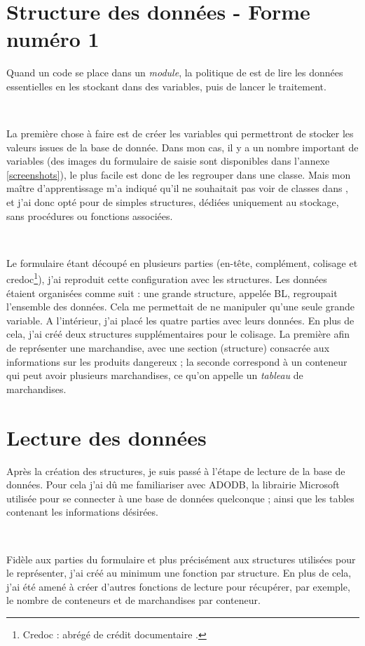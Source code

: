 \section{Structure des données - Forme numéro 1}
Quand un code se place dans un \emph{module}, la politique de \solulog{} est de lire les données essentielles en les stockant dans des variables, puis de lancer le traitement.

~

La première chose à faire est de créer les variables qui permettront de stocker les valeurs issues de la base de donnée. Dans mon cas, il y a un nombre important de  variables (des images du formulaire de saisie sont disponibles dans l'annexe \ref{screenshots}), le plus facile est donc de les regrouper dans une classe. Mais mon maître d'apprentissage m'a indiqué qu'il ne souhaitait pas voir de classes dans \integrale, et j'ai donc opté pour de simples structures, dédiées uniquement au stockage, sans procédures ou fonctions associées.

~

Le formulaire étant découpé en plusieurs parties (en-tête, complément, colisage et credoc\footnote{Credoc : abrégé de \og crédit documentaire \fg.}), j'ai reproduit cette configuration avec les structures. Les données étaient organisées comme suit : une grande structure, appelée BL, regroupait l'ensemble des données. Cela me permettait de ne manipuler qu'une seule grande variable. A l'intérieur, j'ai placé les quatre parties avec leurs données. En plus de cela, j'ai créé deux structures supplémentaires pour le colisage. La première afin de représenter une marchandise, avec une section (structure) consacrée aux informations sur les produits dangereux ; la seconde correspond à un conteneur qui peut avoir plusieurs marchandises, ce qu'on appelle un \emph{tableau} de marchandises.


\section{Lecture des données}
Après la création des structures, je suis passé à l'étape de lecture de la base de données. Pour cela j'ai dû me familiariser avec ADODB, la librairie Microsoft utilisée pour se connecter à une base de données quelconque ; ainsi que les tables contenant les informations désirées.

~

Fidèle aux parties du formulaire et plus précisément aux structures utilisées pour le représenter, j'ai créé au minimum une fonction par structure. En plus de cela, j'ai été amené à créer d'autres fonctions de lecture pour récupérer, par exemple, le nombre de conteneurs et de marchandises par conteneur.

